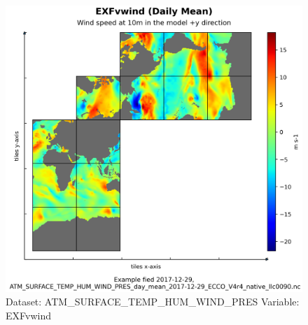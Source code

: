 \begin{figure}[H]
\centering
\includegraphics[scale=0.55]{../images/plots/native_plots/Atmosphere_Surface_Temperature_Humidity_Wind_and_Pressure/EXFvwind.png}
\caption{Dataset: ATM\_SURFACE\_TEMP\_HUM\_WIND\_PRES Variable: EXFvwind}
\label{tab:table-ATM_SURFACE_TEMP_HUM_WIND_PRES_EXFvwind-Plot}
\end{figure}
\pagebreak

